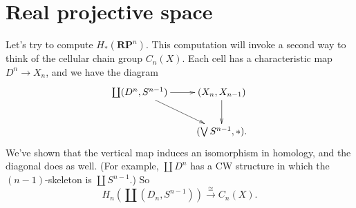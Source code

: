 \section{Real projective space}


Let's try to compute $H_\ast(\mathbf{RP}^n)$. This computation will invoke a 
second way to think of the cellular chain group $C_n(X)$. Each cell has a 
characteristic map $D^n\to X_n$, and we have the diagram
\[
\xymatrix{
\coprod(D^n,S^{n-1}) \ar[r] \ar[dr] & (X_n,X_{n-1}) \ar[d] \\
& (\bigvee S^{n-1},\ast).
}\]
We've shown that the vertical map induces an isomorphism in homology, and
the diagonal does as well. (For example, $\coprod D^n$ has a CW structure 
in which the $(n-1)$-skeleton is $\coprod S^{n-1}$.) So 
\[
H_n(\textstyle{\coprod}(D_n,S^{n-1}))\xrightarrow{\cong}C_n(X).
\]
 
